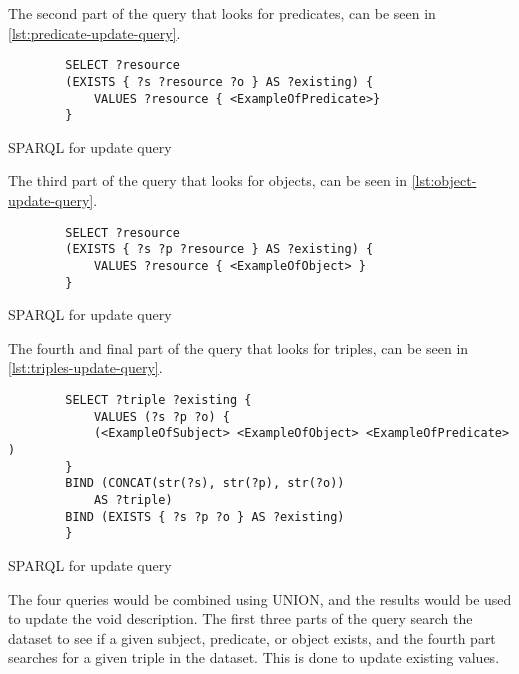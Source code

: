 The second part of the query that looks for predicates, can be seen in \autoref{lst:predicate-update-query}.
\begin{listing}[!ht]
    \begin{verbatim}          
        SELECT ?resource 
        (EXISTS { ?s ?resource ?o } AS ?existing) { 
            VALUES ?resource { <ExampleOfPredicate>}
        } 
    \end{verbatim}
    \caption{SPARQL for update query}
    \label{lst:predicate-update-query}
\end{listing}


The third part of the query that looks for objects, can be seen in \autoref{lst:object-update-query}.

\begin{listing}[!ht]
    \begin{verbatim}          
        SELECT ?resource 
        (EXISTS { ?s ?p ?resource } AS ?existing) { 
            VALUES ?resource { <ExampleOfObject> } 
        }
    \end{verbatim}
    \caption{SPARQL for update query}
    \label{lst:object-update-query}
\end{listing}

The fourth and final part of the query that looks for triples, can be seen in \autoref{lst:triples-update-query}.

\begin{listing}[!ht]
    \begin{verbatim}          
        SELECT ?triple ?existing { 
            VALUES (?s ?p ?o) {  
            (<ExampleOfSubject> <ExampleOfObject> <ExampleOfPredicate> ) 
        }
        BIND (CONCAT(str(?s), str(?p), str(?o)) 
            AS ?triple)
        BIND (EXISTS { ?s ?p ?o } AS ?existing)
        }
    \end{verbatim}
    \caption{SPARQL for update query}
    \label{lst:triples-update-query}
\end{listing}

The four queries would be combined using UNION, and the results would be used to update the \gls{void} description. The first three parts of the query search the dataset to see if a given subject, predicate, or object exists, and the fourth part searches for a given triple in the dataset. This is done to update existing values.

